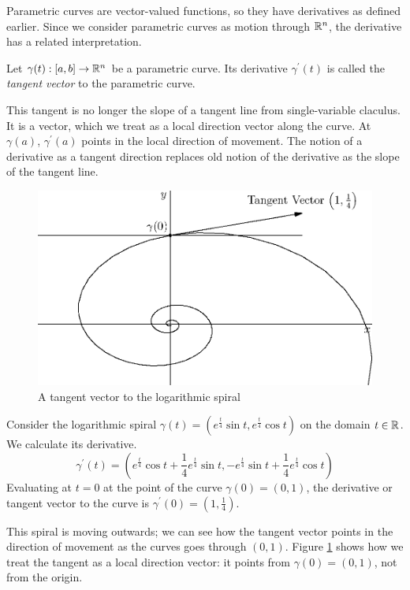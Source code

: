 \documentclass[fleqn,letterpaper]{report}
\begin{document}
Parametric curves are vector-valued functions, so they have
derivatives as defined earlier. Since we consider
parametric curves as motion through $\mathbb{R}^n$, the derivative
has a related interpretation.

\begin{defn} Let $\gamma(t): [a,b] \rightarrow \mathbb{R}^n$ be a
parametric curve. Its derivative $\gamma^\prime(t)$ is called
the \emph{tangent vector} to the parametric curve.
\end{defn}

This tangent is no longer the slope of a tangent line from
single-variable claculus. It is a vector, which we treat as a
local direction vector along the curve. At $\gamma(a)$,
$\gamma^\prime(a)$ points in the local
direction of movement. The notion of a derivative as a
tangent direction replaces old notion of the derivative as the
slope of the tangent line. 

\begin{figure}[t]
\centering
\includegraphics[width=12cm]{figure16.eps}
\caption{A tangent vector to the logarithmic spiral}
\label{figure-logarithmic-spiral-tangent}
\end{figure} 

\begin{example}
Consider the logarithmic spiral $\gamma(t) =
(e^{\frac{t}{4}}\sin t, e^{\frac{t}{4}}\cos t)$ on the domain
$t \in \mathbb{R}$. We calculate its derivative.
\begin{equation*}
\gamma^\prime(t) = \left( e^{\frac{t}{4}} \cos t + \frac{1}{4}
e^{\frac{t}{4}} \sin t, -e^{\frac{t}{4}} \sin t + \frac{1}{4}
e^{\frac{t}{4}} \cos t \right)
\end{equation*}
Evaluating at $t=0$ at the point of the curve $\gamma(0) =
(0,1)$, the derivative or tangent vector to the curve is
$\gamma^\prime(0) = (1,\frac{1}{4})$. 

This spiral is moving outwards; we can see how the
tangent vector points in the direction of movement as the curves
goes through $(0,1)$. Figure \ref{figure-logarithmic-spiral-tangent}
shows how we treat the tangent as a local direction vector: it
points from $\gamma(0) = (0,1)$, not from the origin.
\end{example}
\end{document}
